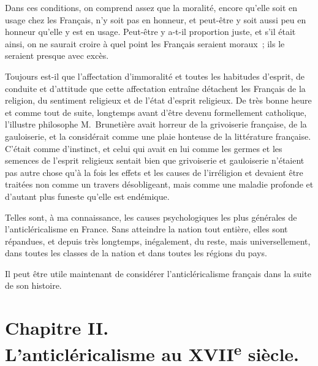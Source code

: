 \documentclass[french,twoside]{book} %
\newcommand{\astertri}{\medskip\par\centerline{\color{rubric}\large\selectfont{\syms ✻\,✻\,✻}}\medskip\par}%
\begin{document}
Dans ces conditions, on comprend assez que la moralité, encore qu’elle soit en usage chez les Français, n’y soit pas en honneur, et peut-être y soit aussi peu en honneur qu’elle y est en usage. Peut-être y a-t-il proportion juste, et s’il était ainsi, on ne saurait croire à quel point les Français seraient moraux ; ils le seraient presque avec excès.\par
Toujours est-il que l’affectation d’immoralité et toutes les habitudes d’esprit, de conduite et d’attitude que cette affectation entraîne détachent les  Français de la religion, du sentiment religieux et de l’état d’esprit religieux. De très bonne heure et comme tout de suite, longtemps avant d’être devenu formellement catholique, l’illustre philosophe M. Brunetière avait horreur de la grivoiserie française, de la gauloiserie, et la considérait comme une plaie honteuse de la littérature française. C’était comme d’instinct, et celui qui avait en lui comme les germes et les semences de l’esprit religieux sentait bien que grivoiserie et gauloiserie n’étaient pas autre chose qu’à la fois les effets et les causes de l’irréligion et devaient être traitées non comme un travers désobligeant, mais comme une maladie profonde et d’autant plus funeste qu’elle est endémique.\par

\astertri

\noindent Telles sont, à ma connaissance, les causes psychologiques les plus générales de l’anticléricalisme en France. Sans atteindre la nation tout entière, elles sont répandues, et depuis très longtemps, inégalement, du reste, mais universellement, dans toutes les classes de la nation et dans toutes les régions du pays.\par
Il peut être utile maintenant de considérer l’anticléricalisme français dans la suite de son histoire.
 \section[{Chapitre II. L’anticléricalisme au XVIIe siècle.}]{Chapitre II.\\
L’anticléricalisme au XVII\textsuperscript{e} siècle.}\renewcommand{\leftmark}{Chapitre II.\\
L’anticléricalisme au XVII\textsuperscript{e} siècle.}
\end{document}
